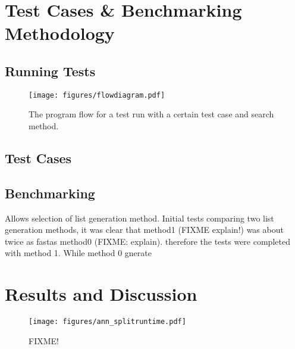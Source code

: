 \chapter{Test Cases \& Benchmarking Methodology}
\label{CHAPTER:BENCHMARKING}

\section{Running Tests}
\label{SECTION:TESTS}

\begin{figure}[h]
	\centering
	\texttt{[image: figures/flowdiagram.pdf]}
	\caption{The program flow for a test run with a certain test case and search method.}
\end{figure}


\section{Test Cases}

\section{Benchmarking}

Allows selection of list generation method. Initial tests comparing two list generation methods, it was clear that method1 (FIXME explain!) was about twice as fastas method0 (FIXME: explain). therefore the tests were completed with method 1. While method 0 gnerate 

\chapter{Results and Discussion}

\begin{table}[htbp]
	\centering
	\renewcommand{\arraystretch}{1.3} %
      
\end{table}


\begin{figure}[h]
	\centering
	\texttt{[image: figures/ann\_splitruntime.pdf]}
	\caption{FIXME!}
\end{figure}

